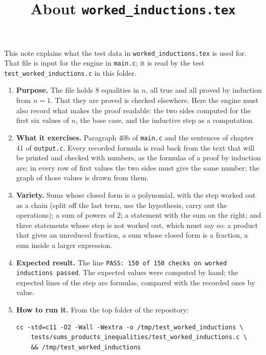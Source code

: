 \documentclass[11pt,a4paper]{article}
\title{About \texttt{worked\_inductions.tex}}
\author{}
\date{}
\begin{document}
\maketitle
This note explains what the test data in \texttt{worked\_inductions.tex} is used for. That file is input for the engine in \texttt{main.c}; it is read by the test \texttt{test\_worked\_inductions.c} in this folder.

\begin{enumerate}
\item \textbf{Purpose.} The file holds 8 equalities in $n$, all true and all proved by induction from $n = 1$. That they are proved is checked elsewhere. Here the engine must also record what makes the proof readable: the two sides computed for the first six values of $n$, the base case, and the inductive step as a computation.

\item \textbf{What it exercises.} Paragraph 40b of \texttt{main.c} and the sentences of chapter 41 of \texttt{output.c}. Every recorded formula is read back from the text that will be printed and checked with numbers, as the formulas of a proof by induction are; in every row of first values the two sides must give the same number; the graph of those values is drawn from them.

\item \textbf{Variety.} Sums whose closed form is a polynomial, with the step worked out as a chain (split off the last term, use the hypothesis, carry out the operations); a sum of powers of $2$; a statement with the sum on the right; and three statements whose step is not worked out, which must say so: a product that gives an unreduced fraction, a sum whose closed form is a fraction, a sum inside a larger expression.

\item \textbf{Expected result.} The line \texttt{PASS: 150 of 150 checks on worked inductions passed}. The expected values were computed by hand; the expected lines of the step are formulas, compared with the recorded ones by value.

\item \textbf{How to run it.} From the top folder of the repository:
\begin{verbatim}
cc -std=c11 -O2 -Wall -Wextra -o /tmp/test_worked_inductions \
    tests/sums_products_inequalities/test_worked_inductions.c \
    && /tmp/test_worked_inductions
\end{verbatim}
\end{enumerate}
\end{document}
